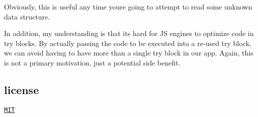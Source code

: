Obviously, this is useful any time you\textquotesingle{}re going to attempt to read some unknown data structure.

In addition, my understanding is that it\textquotesingle{}s hard for JS engines to optimize code in try blocks. By actually passing the code to be executed into a re-\/used try block, we can avoid having to have more than a single try block in our app. Again, this is not a primary motivation, just a potential side benefit.

\subsection*{license}

\href{http://mit.joreteg.com/}{\tt M\+IT} 